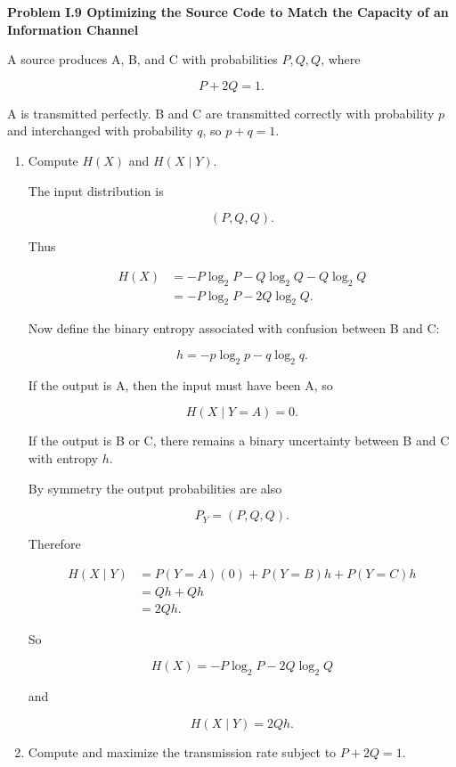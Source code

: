 \documentclass[11pt]{article}
\newcommand{\problem}[1]{%
    \vspace{1em}
    {\large\bfseries #1}
    \par
    \vspace{0.4em}
}
\begin{document}

\problem{Problem I.9 Optimizing the Source Code to Match the Capacity of an Information Channel}

A source produces A, B, and C with probabilities \(P,Q,Q\), where

\[
P+2Q=1.
\]

A is transmitted perfectly. B and C are transmitted correctly with
probability \(p\) and interchanged with probability \(q\), so \(p+q=1\).

\begin{enumerate}

\item Compute \(H(X)\) and \(H(X\mid Y)\).

The input distribution is

\[
(P,Q,Q).
\]

Thus

\begin{align*}
H(X)
&=
-P\log_2P
-Q\log_2Q
-Q\log_2Q \\
&=
-P\log_2P
-2Q\log_2Q.
\end{align*}

Now define the binary entropy associated with confusion between B and C:

\[
h
=
-p\log_2p-q\log_2q.
\]

If the output is A, then the input must have been A, so

\[
H(X\mid Y=A)=0.
\]

If the output is B or C, there remains a binary uncertainty between B and C
with entropy \(h\).

By symmetry the output probabilities are also

\[
P_Y=(P,Q,Q).
\]

Therefore

\begin{align*}
H(X\mid Y)
&=
P(Y=A)(0)
+
P(Y=B)h
+
P(Y=C)h \\
&=
Qh+Qh \\
&=
2Qh.
\end{align*}

So

\[
H(X)
=
-P\log_2P-2Q\log_2Q
\]

and

\[
H(X\mid Y)=2Qh.
\]

\item Compute and maximize the transmission rate subject to \(P+2Q=1\).


\end{enumerate}
\end{document}
